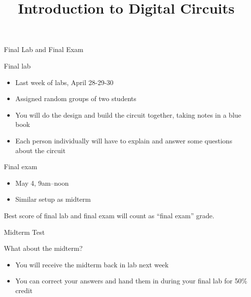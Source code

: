 \documentclass[beamer]{standalone}
\begin{document}
\title[Electronics 1]{Introduction to Digital Circuits}

\begin{frame} 
  \titlepage
\end{frame}

\begin{frame}{Final Lab and Final Exam}
\begin{block}{Final lab}
\begin{itemize}
\item Last week of labs, April 28-29-30
\item Assigned random groups of two students
\item You will do the design and build the circuit together, taking notes in a blue book
\item Each person individually will have to explain and answer some questions about the circuit
\end{itemize}
\end{block}
\begin{block}{Final exam}
\begin{itemize}
\item May 4, 9am--noon
\item Similar setup as midterm
\end{itemize}
\end{block}
\centerline{Best score of final lab and final exam will count as ``final exam'' grade.}
\end{frame}

\begin{frame}{Midterm Test}
\begin{block}{What about the midterm?}
\begin{itemize}
\item You will receive the midterm back in lab next week
\item You can correct your answers and hand them in during your final lab for 50\% credit
\end{itemize}
\end{block}
\end{frame}
\end{document}
